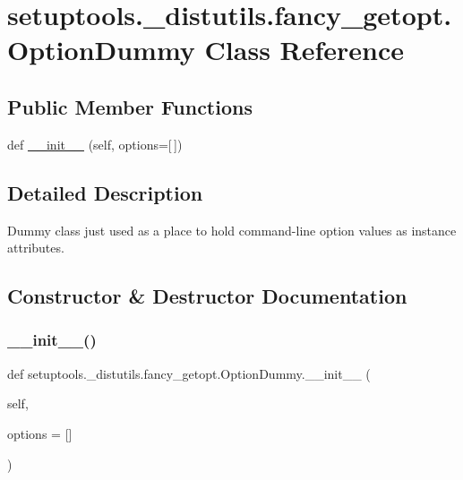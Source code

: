 \hypertarget{classsetuptools_1_1__distutils_1_1fancy__getopt_1_1OptionDummy}{}\section{setuptools.\+\_\+distutils.\+fancy\+\_\+getopt.\+Option\+Dummy Class Reference}
\label{classsetuptools_1_1__distutils_1_1fancy__getopt_1_1OptionDummy}
\subsection*{Public Member Functions}
\begin{DoxyCompactItemize}
\item 
def \hyperlink{classsetuptools_1_1__distutils_1_1fancy__getopt_1_1OptionDummy_aba0b49be300c41fb9396db53b48235be}{\+\_\+\+\_\+init\+\_\+\+\_\+} (self, options=\mbox{[}$\,$\mbox{]})
\end{DoxyCompactItemize}


\subsection{Detailed Description}
\begin{DoxyVerb}Dummy class just used as a place to hold command-line option
values as instance attributes.\end{DoxyVerb}
 

\subsection{Constructor \& Destructor Documentation}
\mbox{\label{classsetuptools_1_1__distutils_1_1fancy__getopt_1_1OptionDummy_aba0b49be300c41fb9396db53b48235be}} 
\subsubsection{\texorpdfstring{\+\_\+\+\_\+init\+\_\+\+\_\+()}{\_\_init\_\_()}}
{\footnotesize\ttfamily def setuptools.\+\_\+distutils.\+fancy\+\_\+getopt.\+Option\+Dummy.\+\_\+\+\_\+init\+\_\+\+\_\+ (\begin{DoxyParamCaption}\item[{}]{self,  }\item[{}]{options = {\ttfamily \mbox{[}\mbox{]}} }\end{DoxyParamCaption})}

